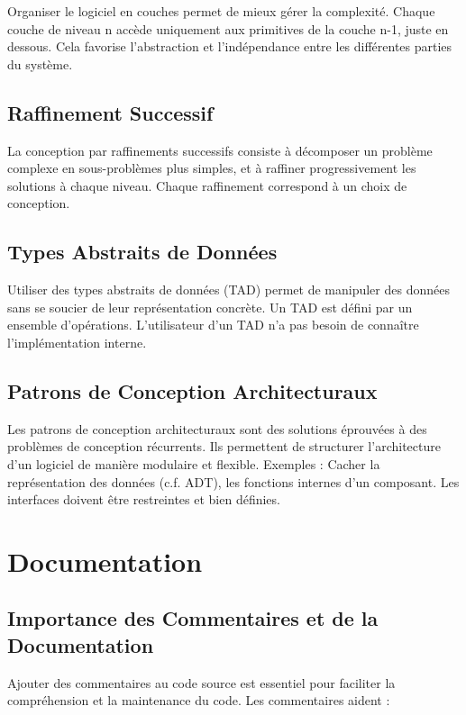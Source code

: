 \documentclass{article}
\begin{document}
\begin{itemize}
Organiser le logiciel en couches permet de mieux gérer la complexité.  Chaque couche de niveau n accède uniquement aux primitives de la couche n-1, juste en dessous.  Cela favorise l'abstraction et l'indépendance entre les différentes parties du système.

\subsection{Raffinement Successif}

La conception par raffinements successifs consiste à décomposer un problème complexe en sous-problèmes plus simples, et à raffiner progressivement les solutions à chaque niveau.  Chaque raffinement correspond à un choix de conception.

\subsection{Types Abstraits de Données}

Utiliser des types abstraits de données (TAD) permet de manipuler des données sans se soucier de leur représentation concrète.  Un TAD est défini par un ensemble d'opérations.  L'utilisateur d'un TAD n'a pas besoin de connaître l'implémentation interne.

\subsection{Patrons de Conception Architecturaux}

Les patrons de conception architecturaux sont des solutions éprouvées à des problèmes de conception récurrents.  Ils permettent de structurer l'architecture d'un logiciel de manière modulaire et flexible.  Exemples : Cacher la représentation des données (c.f. ADT), les fonctions internes d'un composant. Les interfaces doivent être restreintes et bien définies.

\section{Documentation}

\subsection{Importance des Commentaires et de la Documentation}

Ajouter des commentaires au code source est essentiel pour faciliter la compréhension et la maintenance du code.  Les commentaires aident :


\end{itemize}
\end{document}
